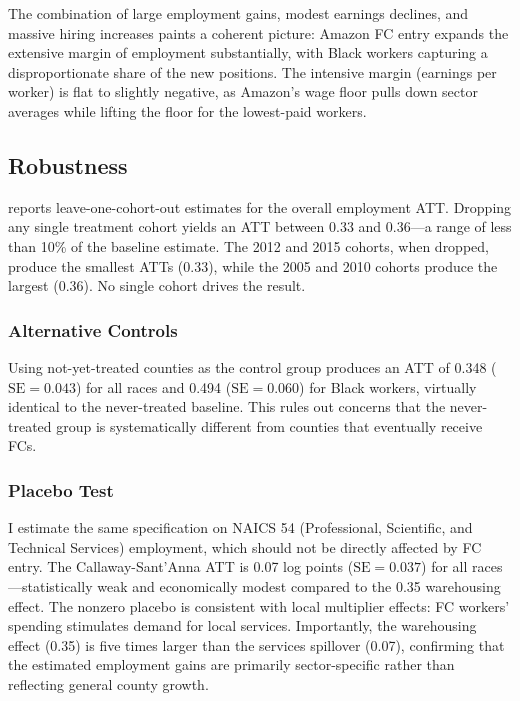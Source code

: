 \documentclass[12pt]{article}
\begin{document}
The combination of large employment gains, modest earnings declines, and massive hiring increases paints a coherent picture: Amazon FC entry expands the extensive margin of employment substantially, with Black workers capturing a disproportionate share of the new positions. The intensive margin (earnings per worker) is flat to slightly negative, as Amazon's wage floor pulls down sector averages while lifting the floor for the lowest-paid workers.


\subsection{Robustness}



 reports leave-one-cohort-out estimates for the overall employment ATT. Dropping any single treatment cohort yields an ATT between 0.33 and 0.36---a range of less than 10\% of the baseline estimate. The 2012 and 2015 cohorts, when dropped, produce the smallest ATTs (0.33), while the 2005 and 2010 cohorts produce the largest (0.36). No single cohort drives the result.

\subsubsection*{Alternative Controls} Using not-yet-treated counties as the control group produces an ATT of 0.348 ($\text{SE} = 0.043$) for all races and 0.494 ($\text{SE} = 0.060$) for Black workers, virtually identical to the never-treated baseline. This rules out concerns that the never-treated group is systematically different from counties that eventually receive FCs.

\subsubsection*{Placebo Test} I estimate the same specification on NAICS 54 (Professional, Scientific, and Technical Services) employment, which should not be directly affected by FC entry. The Callaway-Sant'Anna ATT is 0.07 log points ($\text{SE} = 0.037$) for all races---statistically weak and economically modest compared to the 0.35 warehousing effect. The nonzero placebo is consistent with local multiplier effects: FC workers' spending stimulates demand for local services. Importantly, the warehousing effect (0.35) is five times larger than the services spillover (0.07), confirming that the estimated employment gains are primarily sector-specific rather than reflecting general county growth.
\end{document}
